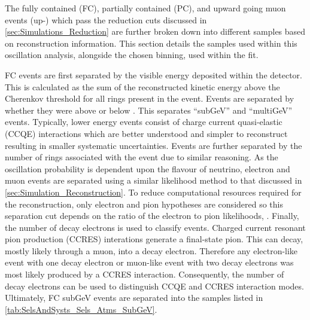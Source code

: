 The fully contained (FC), partially contained (PC), and upward going muon events (up-\quickmath{\mu}) which pass the reduction cuts discussed in \autoref{sec:Simulations_Reduction} are further broken down into different samples based on reconstruction information. This section details the samples used within this oscillation analysis, alongside the chosen binning, used within the fit.

FC events are first separated by the visible energy deposited within the detector. This is calculated as the sum of the reconstructed kinetic energy above the Cherenkov threshold for all rings present in the event. Events are separated by whether they were above or below . This separates ``subGeV'' and ``multiGeV'' events. Typically, lower energy events consist of charge current quasi-elastic (CCQE) interactions which are better understood and simpler to reconstruct resulting in smaller systematic uncertainties. Events are further separated by the number of rings associated with the event due to similar reasoning. As the oscillation probability is dependent upon the flavour of neutrino, electron and muon events are separated using a similar likelihood method to that discussed in \autoref{sec:Simulation_Reconstruction}. To reduce computational resources required for the reconstruction, only electron and pion hypotheses are considered so this separation cut depends on the ratio of the electron to pion likelihoods, . Finally, the number of decay electrons is used to classify events. Charged current resonant pion production (CCRES) interations generate a final-state pion. This can decay, mostly likely through a muon, into a decay electron. Therefore any electron-like event with one decay electron or muon-like event with two decay electrons was most likely produced by a CCRES interaction. Consequently, the number of decay electrons can be used to distinguish CCQE and CCRES interaction modes. Ultimately, FC subGeV events are separated into the samples listed in \autoref{tab:SelsAndSysts_Sels_Atms_SubGeV}.

